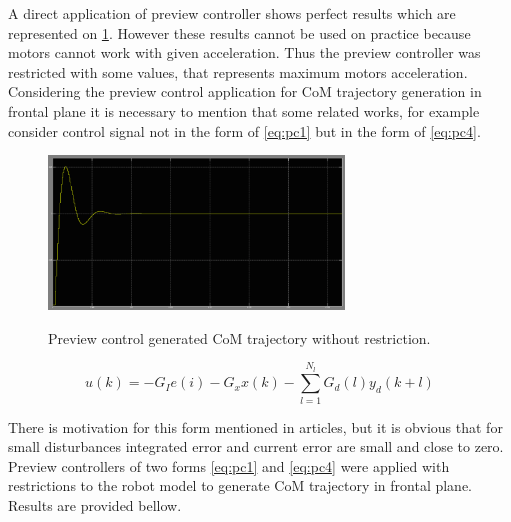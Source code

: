 \documentclass[12pt,a4paper]{report}
\begin{document}
		A direct application of preview controller shows perfect results which are represented on \cref{fig:25}. However these results cannot be used on practice because motors cannot work with given acceleration. Thus the preview controller was restricted with some values, that represents maximum motors acceleration.
		Considering the preview control application for CoM trajectory generation in frontal plane it is necessary to mention that some related works, for example \cite{choi2006fuzzy} consider control signal not in the form of \ref{eq:pc1} but in the form of \ref{eq:pc4}.
		
		\begin{figure}[H]
			\vspace{-0.2cm}
			\centering
			{\includegraphics[width=0.7\textwidth]{25}}
			\caption{Preview control generated CoM trajectory without restriction.}
			\label{fig:25}
			\vspace{-0.1cm}
		\end{figure}
		
		\begin{equation}\label{eq:pc4}
			u(k) = -G_I e(i) - G_xx(k) - \sum^{N_l}_{l=1}G_d(l)y_d(k+l)
		\end{equation}
		
		 There is motivation for this form mentioned in articles, but it is obvious that for small disturbances integrated error and current error are small and close to zero. Preview controllers of two forms \ref{eq:pc1} and \ref{eq:pc4} were applied with restrictions to the robot model to generate CoM trajectory in frontal plane. Results are provided bellow.
		 
\end{document}
